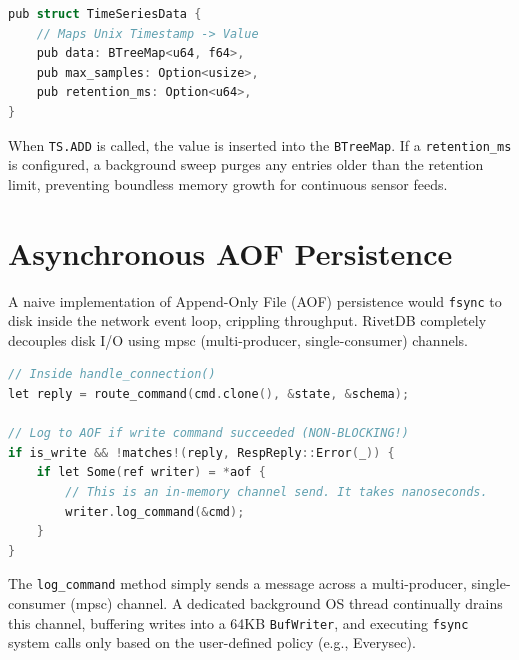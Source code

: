 \begin{lstlisting}[language=C, caption=Time-Series Data Structure (\texttt{src/storage/timeseries.rs})]
pub struct TimeSeriesData {
    // Maps Unix Timestamp -> Value
    pub data: BTreeMap<u64, f64>,
    pub max_samples: Option<usize>,
    pub retention_ms: Option<u64>,
}
\end{lstlisting}

When \texttt{TS.ADD} is called, the value is inserted into the \texttt{BTreeMap}. If a \texttt{retention\_ms} is configured, a background sweep purges any entries older than the retention limit, preventing boundless memory growth for continuous sensor feeds.

\section{Asynchronous AOF Persistence}

A naive implementation of Append-Only File (AOF) persistence would \texttt{fsync} to disk inside the network event loop, crippling throughput. RivetDB completely decouples disk I/O using mpsc (multi-producer, single-consumer) channels.

\begin{lstlisting}[language=C, caption=Asynchronous AOF Logging (\texttt{src/persistence/aof.rs})]
// Inside handle_connection()
let reply = route_command(cmd.clone(), &state, &schema);

// Log to AOF if write command succeeded (NON-BLOCKING!)
if is_write && !matches!(reply, RespReply::Error(_)) {
    if let Some(ref writer) = *aof {
        // This is an in-memory channel send. It takes nanoseconds.
        writer.log_command(&cmd); 
    }
}
\end{lstlisting}

The \texttt{log\_command} method simply sends a message across a multi-producer, single-consumer (mpsc) channel. A dedicated background OS thread continually drains this channel, buffering writes into a 64KB \texttt{BufWriter}, and executing \texttt{fsync} system calls only based on the user-defined policy (e.g., Everysec).

